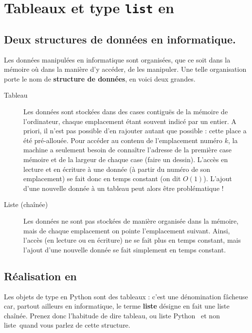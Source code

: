 
\section{Tableaux et type \texttt{list} en \python}

\subsection{Deux structures de données en informatique.}

Les données manipulées en informatique sont organisées, que ce soit dans la mémoire où dans la manière d'y accéder, de les manipuler. 
Une telle organisation porte le nom de \textbf{structure de données}, en voici deux grandes.  

\begin{description}
  \item[Tableau] Les données sont stockées dans des cases contiguës de la mémoire de l'ordinateur, chaque emplacement étant souvent indicé par un entier. 
    A priori, il n'est pas possible d'en rajouter autant que possible : cette place a été pré-allouée. 
    Pour accéder au contenu de l'emplacement numéro $k$, la machine a seulement besoin de connaître 
l'adresse de la première case mémoire et de la largeur de chaque case (faire un dessin). 
    L'accès en lecture et en écriture à une donnée (à partir du numéro de son emplacement) se fait donc en temps constant (on dit $O(1)$).
    L'ajout d'une nouvelle donnée à un tableau peut alors être problématique !
  \item[Liste (chaînée)] Les données ne sont pas stockées de manière organisée dans la mémoire, 
mais de chaque emplacement on pointe l'emplacement suivant. 
    Ainsi, l'accès (en lecture ou en écriture) ne se fait plus en temps constant, mais l'ajout d'une nouvelle donnée se fait simplement en temps constant. 
\end{description}

\subsection{Réalisation en \python}

Les objets de type  en Python sont des tableaux : c'est une 
dénomination fâcheuse car, partout ailleurs en informatique, le terme
\textbf{liste} désigne en fait une liste chaînée. Prenez donc
l'habitude de dire \og tableau\fg, ou \og liste Python \fg\ et non \og liste\fg\ quand vous parlez de cette
structure.

